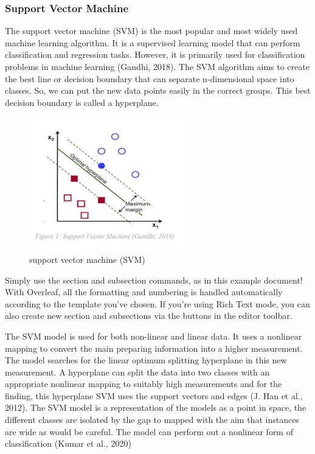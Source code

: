 \documentclass{article}
\begin{document}
 

\subsubsection{Support Vector Machine}

 The support vector machine (SVM) is the most popular and most widely used machine learning algorithm. It is a supervised learning model that can perform classification and regression tasks. However, it is primarily used for classification problems in machine learning (Gandhi, 2018). The SVM algorithm aims to create the best line or decision boundary that can separate n-dimensional space into classes. So, we can put the new data points easily in the correct groups. This best decision boundary is called a hyperplane.

\begin{figure}[h!]
  \centering
  \includegraphics[width=0.6\textwidth]{svm.jpg}
  \caption{support vector machine (SVM)}
\end{figure}

Simply use the section and subsection commands, as in this example document! With Overleaf, all the formatting and numbering is handled automatically according to the template you've chosen. If you're using Rich Text mode, you can also create new section and subsections via the buttons in the editor toolbar.


The SVM model is used for both non-linear and linear data. It uses a nonlinear mapping to convert the main preparing information into a higher measurement. The model searches for the linear optimum splitting hyperplane in this new measurement. A hyperplane can split the data into two classes with an appropriate nonlinear mapping to suitably high measurements and for the finding, this hyperplane SVM uses the support vectors and edges (J. Han et al., 2012). The SVM model is a representation of the models as a point in space, the different classes are isolated by the gap to mapped with the aim that instances are wide as would be careful. The model can perform out a nonlinear form of classification (Kumar et al., 2020)
\end{document}
